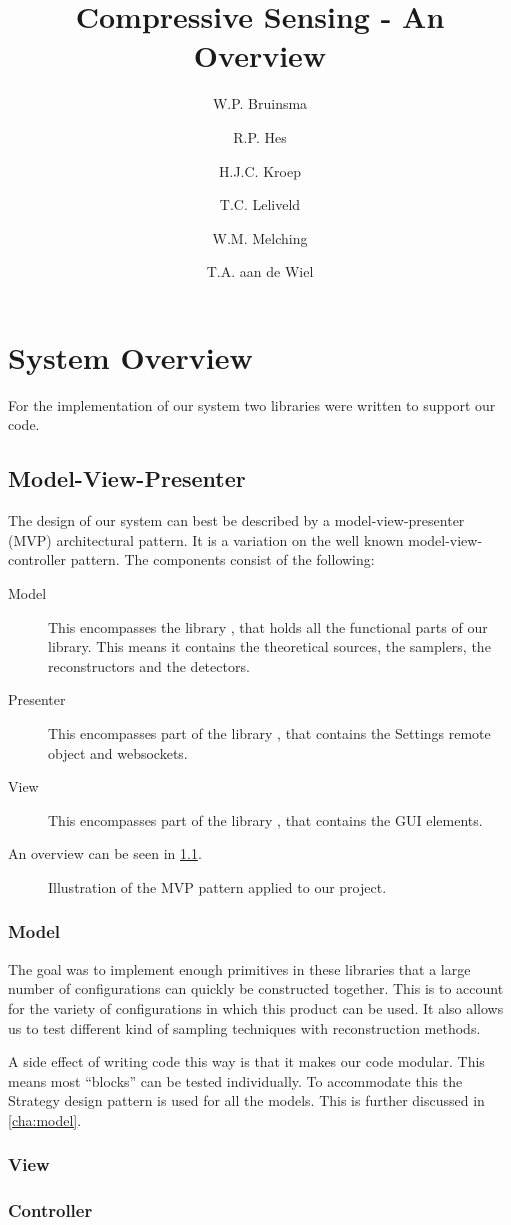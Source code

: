 \documentclass[a4paper, openany, oneside]{memoir}
\title{Compressive Sensing - An Overview}
\author{W.P. Bruinsma \and R.P. Hes \and H.J.C. Kroep \and T.C. Leliveld \and W.M. Melching \and T.A. aan de Wiel}
\begin{document}
\chapter{System Overview}
For the implementation of our system two libraries were written to support our code. 

\section{Model-View-Presenter}
\label{sec:model-view-presenter}
The design of our system can best be described by a model-view-presenter (MVP) architectural pattern. It is a variation on the well known model-view-controller pattern. The components consist of the following:
\begin{description}
    \item[Model] This encompasses the library , that holds all the functional parts of our library. This means it contains the theoretical sources, the samplers, the reconstructors and the detectors.
    \item[Presenter] This encompasses part of the library , that contains the Settings remote object and websockets.
    \item[View] This encompasses part of the library , that contains the GUI elements.
\end{description}
An overview can be seen in \cref{fig:MVP}.

\begin{figure}
    \centering
    
    \caption{Illustration of the MVP pattern applied to our project.}
    \label{fig:MVP}
\end{figure}

\subsection{Model}
\label{sec:model}
The goal was to implement enough primitives in these libraries that a large number of configurations can quickly be constructed together. This is to account for the variety of configurations in which this product can be used. It also allows us to test different kind of sampling techniques with reconstruction methods.

A side effect of writing code this way is that it makes our code modular. This means most ``blocks'' can be tested individually. To accommodate this the Strategy \cite{designpatterns} design pattern is used for all the models. This is further discussed in \cref{cha:model}.

\subsection{View}
\label{sec:view}


\subsection{Controller}
\label{sec:controller}
\end{document}
